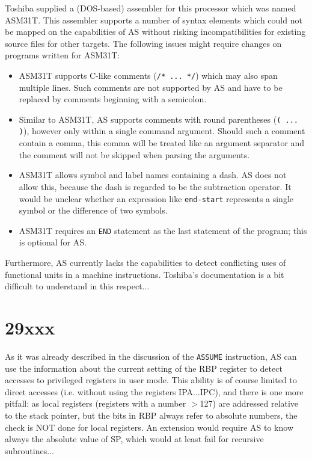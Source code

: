 \documentclass[12pt,twoside]{report}
\newcommand{\tty}[1]{{\tt #1}}
\newcommand{\asname}{{AS}}
\begin{document}
Toshiba supplied a (DOS-based) assembler for this processor which
was named ASM31T.  This assembler supports a number of syntax
elements which could not be mapped on the capabilities of \asname{}
without risking incompatibilities for existing source files for
other targets.  The following issues might require changes on
programs written for ASM31T:

\begin{itemize}
\item{ASM31T supports C-like comments (\verb!/* ... */!) which
      may also span multiple lines.  Such comments are not
      supported by \asname{} and have to be replaced by comments
      beginning with a semicolon.}
\item{Similar to ASM31T, \asname{} supports comments with round parentheses
      (\verb!( ... )!), however only within a single command
      argument.  Should such a comment contain a comma, this
      comma will be treated like an argument separator and the
      comment will not be skipped when parsing the arguments.}
\item{ASM31T allows symbol and label names containing a dash.
      \asname{} does not allow this, because the dash is regarded to be
      the subtraction operator.  It would be unclear whether an
      expression like \verb!end-start! represents a single symbol
      or the difference of two symbols.}
\item{ASM31T requires an \tty{END} statement as the last
      statement of the program; this is optional for \asname{}.}
\end{itemize}

Furthermore, \asname{} currently lacks the capabilities to detect
conflicting uses of functional units in a machine instructions.
Toshiba's documentation is a bit difficult to understand in this
respect...


\section{29xxx}

As it was already described in the discussion of the \tty{ASSUME}
instruction, \asname{} can use the information about the current setting of
the RBP register to detect accesses to privileged registers in user
mode.  This ability is of course limited to direct accesses (i.e.
without using the registers IPA...IPC), and there is one more
pitfall: as local registers (registers with a number $>$127) are
addressed relative to the stack pointer, but the bits in RBP always
refer to absolute numbers, the check is NOT done for local registers.
An extension would require \asname{} to know always the absolute value of
SP, which would at least fail for recursive subroutines...
\end{document}
